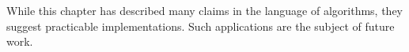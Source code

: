 \documentclass[10]{report}
\newcommand{\algoname}[1]{\textnormal{\textsc{#1}}}
\begin{document}
While this chapter has described many claims in the language of algorithms, they suggest practicable implementations. 
Such applications are the subject of future work. 



%
%
\end{document}
